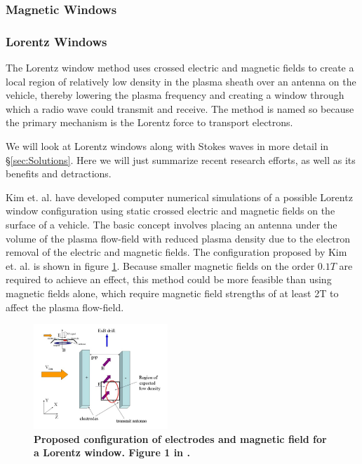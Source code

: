 \documentclass[twocolumn]{article}
\begin{document}
	\subsubsection*{Magnetic Windows}
	
	
	\subsubsection*{Lorentz Windows}
	The Lorentz window method uses crossed electric and magnetic fields to create a local region of relatively low density in the plasma sheath over an antenna on the vehicle, thereby lowering the plasma frequency and creating a window through which a radio wave could transmit and receive.
	The method is named so because the primary mechanism is the Lorentz force to transport electrons.
	
	We will look at Lorentz windows along with Stokes waves in more detail in \S\ref{sec:Solutions}.
	Here we will just summarize recent research efforts, as well as its benefits and detractions.
	
	Kim et. al. have developed computer numerical simulations of a possible Lorentz window configuration using static crossed electric and magnetic fields on the surface of a vehicle.\cite{kim_plasma_2007}\cite{kim_analysis_2008}\cite{kim_modeling_2010}
	The basic concept involves placing an antenna under the volume of the plasma flow-field with reduced plasma density due to the electron removal of the electric and magnetic fields.
	The configuration proposed by Kim et. al. is shown in figure \ref{fig:KimExBConfig}.
	Because smaller magnetic fields on the order $0.1 T$ are required to achieve an effect, this method could be more feasible than using magnetic fields alone, which require magnetic field strengths of at least 2T to affect the plasma flow-field.\cite{otsu_feasibility_2006}
	
	\begin{figure}[H]
		\centering
			\includegraphics[width=0.45\textwidth]{Images/Kimetal_ExB_config.png}
		\caption{\textbf{Proposed configuration of electrodes and magnetic field for a Lorentz window. Figure 1 in \cite{kim_plasma_2007}.}}
		\label{fig:KimExBConfig}
	\end{figure}
	
\end{document}
